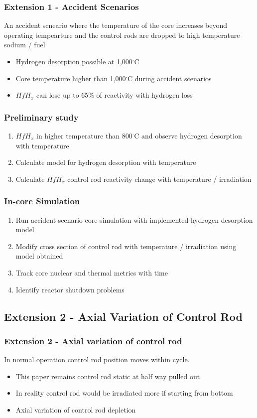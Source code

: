 \documentclass[9pt]{beamer}
\newcommand{\hfh}{$HfH_{x}$\xspace}
\begin{document}
\begin{frame}
\frametitle{Extension 1 - Accident Scenarios}
An accident scneario where the temperature of the core increases beyond operating tempearture
and the control rods are dropped to high temperature sodium / fuel 
\begin{itemize}
    \item Hydrogen desorption possible at 1,000$^\cdot$C \cite{konashi_development_2013}
    \item Core temperature higher than 1,000$^\cdot$C during accident scenarios
    \item \hfh can lose up to 65\% of reactivity with hydrogen loss
\end{itemize}
\end{frame}


\begin{frame}
\frametitle{Preliminary study}
\begin{enumerate}
    \item \hfh in higher temperature than 800$^\cdot$C and observe hydrogen desorption with temperature
    \item Calculate model for hydrogen desorption with temperature
    \item Calculate \hfh control rod reactivity change with temperature / irradiation
\end{enumerate}
\end{frame}

\begin{frame}
\frametitle{In-core Simulation}
\begin{enumerate}
    \item Run accident scenario core simulation with implemented hydrogen desorption
          model
    \item Modify cross section of control rod with temperature / irradiation using model obtained
    \item Track core nuclear and thermal metrics with time
    \item Identify reactor shutdown problems
\end{enumerate}
\end{frame}

\subsection{Extension 2 - Axial Variation of Control Rod}

\begin{frame}
\frametitle{Extension 2 - Axial variation of control rod}
In normal operation control rod position moves within cycle.
\begin{itemize}
    \item This paper remains control rod static at half way pulled out
    \item In reality control rod would be irradiated more if starting from bottom
    \item Axial variation of control rod depletion
\end{itemize}
\end{frame}
\end{document}
